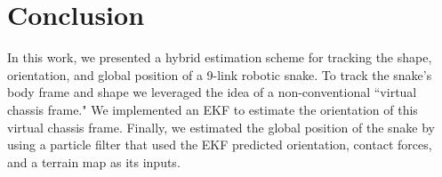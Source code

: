 \documentclass[letterpaper, 10 pt, conference]{ieeeconf}  %
\begin{document}
\section{Conclusion}
In this work, we presented a hybrid estimation scheme for tracking the shape, orientation, and global position of a 9-link robotic snake. To track the snake's body frame and shape we leveraged the idea of a non-conventional ``virtual chassis frame." We implemented an EKF to estimate the orientation of this virtual chassis frame. Finally, we estimated the global position of the snake by using a particle filter that used the EKF predicted orientation, contact forces, and a terrain map as its inputs. 


\newpage
\printbibliography
\end{document}

